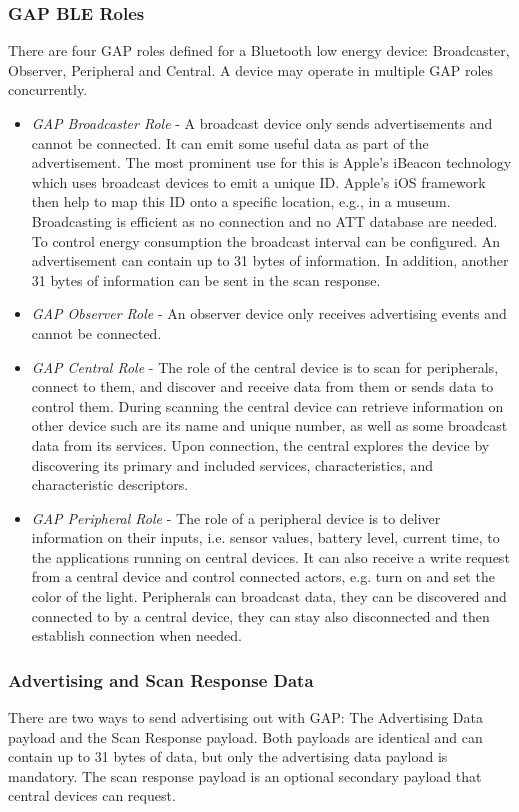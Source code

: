 \subsubsection{GAP BLE Roles}
There are four GAP roles defined for a Bluetooth low energy device: Broadcaster, Observer, Peripheral and Central. A device may operate in multiple GAP roles concurrently.
\begin{itemize}
\item \emph{GAP Broadcaster Role} - A broadcast device only sends advertisements and cannot be connected. It can emit some useful data as part of the advertisement. The most prominent use for this is Apple's iBeacon technology which uses broadcast devices to emit a unique ID. Apple's iOS framework then help to map this ID onto a specific location, e.g., in a museum. Broadcasting is efficient as no connection and no ATT database are needed. To control energy consumption the broadcast interval can be configured. An advertisement can contain up to 31 bytes of information. In addition, another 31 bytes of information can be sent in the scan response.
\item \emph{GAP Observer Role} - An observer device only receives advertising events and cannot be connected. 
\item \emph{GAP Central Role} - The role of the central device is to scan for peripherals, connect to them, and discover and receive data from them or sends data to control them. During scanning the central device can retrieve information on other device such are its name and unique number, as well as some broadcast data from its services. Upon connection, the central explores the device by discovering its primary and included services, characteristics, and characteristic descriptors.
\item \emph{GAP Peripheral Role} - The role of a peripheral device is to deliver information on their inputs, i.e. sensor values, battery level, current time, to the applications running on central devices. It can also receive a write request from a central device and control connected actors, e.g. turn on and set the color of the light. Peripherals can broadcast data, they can be discovered and connected to by a central device, they can stay also disconnected and then establish connection when needed. 
\end{itemize} 
\subsubsection{Advertising and Scan Response Data}
There are two ways to send advertising out with GAP: The Advertising Data payload and the Scan Response payload. Both payloads are identical and can contain up to 31 bytes of data, but only the advertising data payload is mandatory. The scan response payload is an optional secondary payload that central devices can request.

